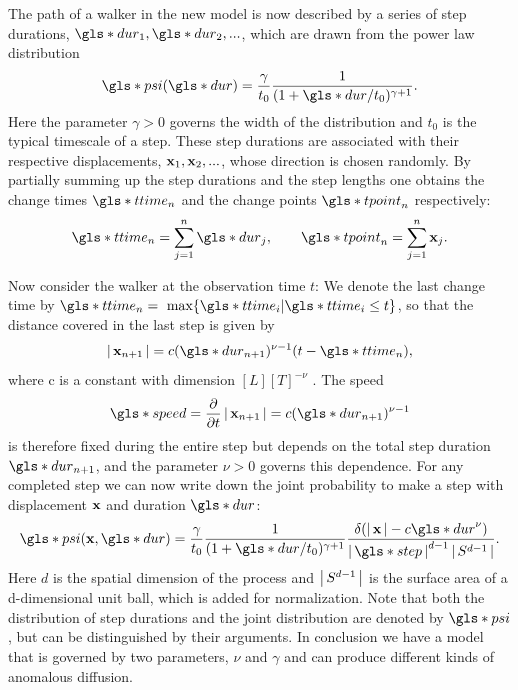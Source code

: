 The path of a walker in the new model is now described by a series of step durations, $\gls*{dur}_1, \gls*{dur}_2, ...$, which are drawn from the power law distribution 
%
\begin{align}
\gls*{psi}(\gls*{dur}) = \frac{\gamma}{t_0} \frac{1}{(1+\gls*{dur}/t_0)^{\gamma+1}} .
\label{eqn:defPsiT}
\end{align}
%
Here the parameter $\gamma>0$ governs the width of the distribution and $t_0$ is the typical timescale of a step. These step durations are associated with their respective displacements, $\mathbf{ x }_1, \mathbf{ x }_2, ...$, whose direction is chosen randomly. By partially summing up the step durations and the step lengths one obtains the change times $\gls*{ttime}_n$ and the change points $\gls*{tpoint}_n$ respectively:
%
\begin{align}
\gls*{ttime}_n = \sum_{j=1}^n \gls*{dur}_j , \qquad \gls*{tpoint}_n = \sum_{j=1}^n \ve{x}_j .
\end{align}

Now consider the walker at the observation time $t$: We denote the last change time by $\gls*{ttime}_n = \text{ max} \{\gls*{ttime}_i | \gls*{ttime}_i \leq t \}$, so that the distance covered in the last step is given by
%
\begin{align}
\abs{\ve{x}_{n+1}} = c (\gls*{dur}_{n+1})^{\nu-1} (t-\gls*{ttime}_n) ,
\end{align}
%
where c is a constant with dimension $ [ L ] [ T ]^{-\nu} $ . The speed 
%
\begin{align}
\gls*{speed} = \pder{}{t} \abs{\ve{x}_{n+1}} = c (\gls*{dur}_{n+1})^{\nu-1}
\end{align}
%
is therefore fixed during the entire step but depends on the total step duration $\gls*{dur}_{n+1}$, and the parameter $\nu>0$ governs this dependence. For any completed step we can now write down the joint probability to make a step with displacement $\mathbf{ x }$ and duration $\gls*{dur}$:
%
\begin{align}
\gls*{psi}(\ve{x}, \gls*{dur} ) = \frac{\gamma}{t_0} \frac{1}{(1+\gls*{dur}/t_0)^{\gamma+1}}  \frac{\delta(\abs{\ve{x}} - c \gls*{dur}^{\nu}) }{\abs{\gls*{step}}^{d-1} \abs{S^{d-1}}}  \label{eqn:defPsiXT}.
\end{align}
%
Here $d$ is the spatial dimension of the process and $\left|\,S^{d-1}\,\right|$ is the surface area of a d-dimensional unit ball, which is added for normalization. Note that both the distribution of step durations and the joint distribution are denoted by $\gls*{psi}$, but can be distinguished by their arguments. In conclusion we have a model that is governed by two parameters, $\nu$ and $\gamma$ and can produce different kinds of anomalous diffusion. 

